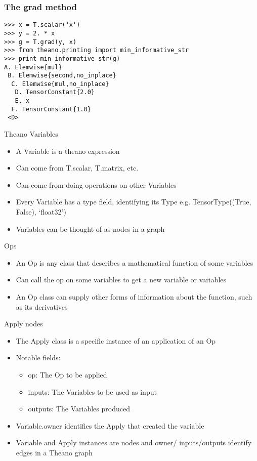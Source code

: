 \documentclass[utf8x,xcolor=pdftex,dvipsnames,table]{beamer}
\begin{document}
\begin{frame}[fragile]
  \frametitle{The grad method}

\begin{lstlisting}
>>> x = T.scalar('x')
>>> y = 2. * x
>>> g = T.grad(y, x)
>>> from theano.printing import min_informative_str
>>> print min_informative_str(g)
A. Elemwise{mul}
 B. Elemwise{second,no_inplace}
  C. Elemwise{mul,no_inplace}
   D. TensorConstant{2.0}
   E. x
  F. TensorConstant{1.0}
 <D>
\end{lstlisting}
\end{frame}

\begin{frame}{Theano Variables}
  \begin{itemize}
  \item A Variable is a theano expression
  \item Can come from T.scalar, T.matrix, etc.
  \item Can come from doing operations on other Variables
  \item Every Variable has a type field, identifying its Type \newline
    e.g. TensorType((True, False), ‘float32’)
  \item Variables can be thought of as nodes in a graph
  \end{itemize}
\end{frame}

\begin{frame}{Ops}

  \begin{itemize}
  \item  An Op is any class that describes a
mathematical function of some variables
  \item Can call the op on some variables to get a
new variable or variables
  \item An Op class can supply other forms of
information about the function, such as its
derivatives
  \end{itemize}
\end{frame}

\begin{frame}{Apply nodes}
  \begin{itemize}
  \item The Apply class is a specific instance of an application of an Op
  \item Notable fields:
    \begin{itemize}
    \item op: The Op to be applied
    \item inputs: The Variables to be used as input
    \item outputs: The Variables produced
    \end{itemize}
  \item Variable.owner identifies the Apply that created the variable
  \item Variable and Apply instances are nodes and owner/
    inputs/outputs identify edges in a Theano graph
  \end{itemize}
\end{frame}
\end{document}
